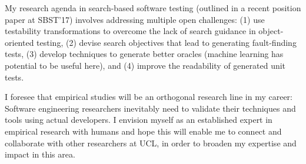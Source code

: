 \documentclass[a4paper]{article}
\begin{document}
My research agenda in search-based software testing (outlined in a
recent position paper at SBST'17) involves addressing multiple open
challenges: (1) use testability transformations to overcome the lack
of search guidance in object-oriented testing, (2) devise search
objectives that lead to generating fault-finding tests, (3) develop
techniques to generate better oracles (machine learning has potential
to be useful here), and (4) improve the readability of generated unit
tests.

I foresee that empirical studies will be an orthogonal research line
in my career: Software engineering researchers inevitably need to
validate their techniques and tools using actual developers. I
envision myself as an established expert in empirical research with
humans and hope this will enable me to connect and collaborate with
other researchers at UCL, in order to broaden my expertise and impact
in this area.
\end{document}
